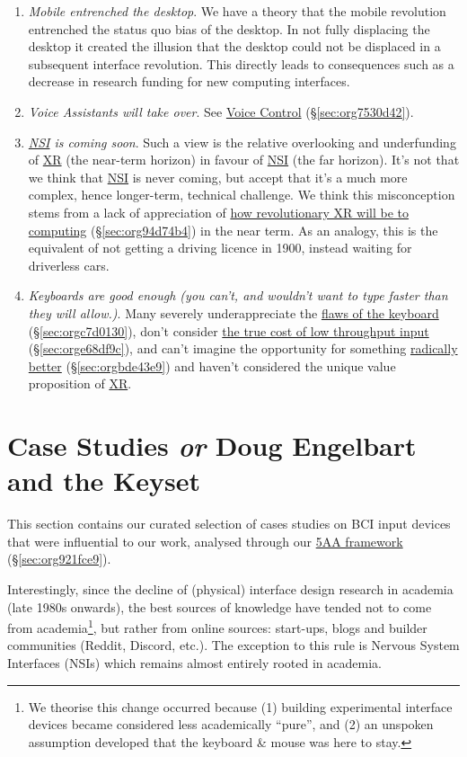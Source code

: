 \documentclass[logo,bsc,singlespacing,parskip]{infthesis}
\begin{document}
\begin{enumerate}
\item \emph{Mobile entrenched the desktop}.
We have a theory that the mobile revolution entrenched the status quo bias of the desktop.
In not fully displacing the desktop it created the illusion that the desktop could not be displaced in a subsequent interface revolution.
This directly leads to consequences such as a decrease in research funding for new computing interfaces.

\item \emph{Voice Assistants will take over}.
See \hyperref[sec:org7530d42]{Voice Control} (\S \ref{sec:org7530d42}).

\item \emph{\hyperref[org79fc546]{NSI} is coming soon}.
Such a view is the relative overlooking and underfunding of \hyperref[org1d567af]{XR} (the near-term horizon) in favour of \hyperref[org79fc546]{NSI} (the far horizon).
It's not that we think that \hyperref[org79fc546]{NSI} is never coming, but accept that it's a much more complex, hence longer-term, technical challenge.
We think this misconception stems from a lack of appreciation of \hyperref[sec:org94d74b4]{how revolutionary XR will be to computing} (\S \ref{sec:org94d74b4}) in the near term.
As an analogy, this is the equivalent of not getting a driving licence in 1900, instead waiting for driverless cars.

\item \emph{Keyboards are good enough (you can't, and wouldn't want to type faster than they will allow.)}.
Many severely underappreciate the \hyperref[sec:orgc7d0130]{flaws of the keyboard} (\S \ref{sec:orgc7d0130}), don't consider \hyperref[sec:orge68df9c]{the true cost of low throughput input} (\S \ref{sec:orge68df9c}), and can't imagine the opportunity for something \hyperref[sec:orgbde43e9]{radically better} (\S \ref{sec:orgbde43e9}) and haven't considered the unique value proposition of \hyperref[org1d567af]{XR}.
\end{enumerate}

\part{Case Studies \emph{or} Doug Engelbart and the Keyset}
\label{sec:org0d3df1f}
This section contains our curated selection of cases studies on BCI input devices that were influential to our work, analysed through our \hyperref[sec:org921fce9]{5AA framework} (\S \ref{sec:org921fce9}).

Interestingly, since the decline of (physical) interface design research in academia (late 1980s onwards), the best sources of knowledge have tended not to come from academia\footnote{We theorise this change occurred because (1) building experimental interface devices became considered less academically ``pure'', and (2) an unspoken assumption developed that the keyboard \& mouse was here to stay.}, but rather from online sources: start-ups, blogs and builder communities (Reddit, Discord, etc.).
The exception to this rule is Nervous System Interfaces (NSIs) which remains almost entirely rooted in academia.
\end{document}

